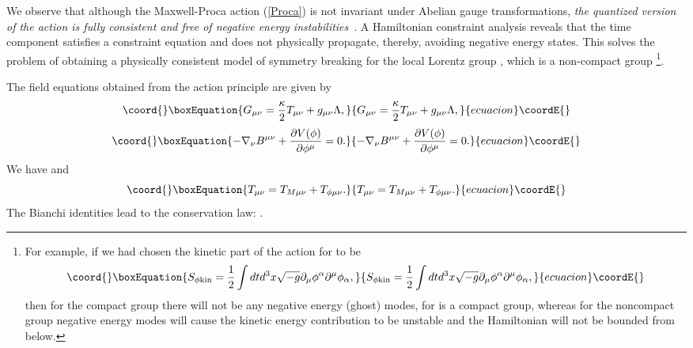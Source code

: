 \documentclass[a4paper,12pt]{article}
\begin{document}
We observe that although the Maxwell-Proca action (\ref{Proca})
is not invariant under Abelian \coordHE{} gauge transformations,
{\it the quantized version of the action is fully consistent and
free of negative energy instabilities}~\cite{Isenberg}. A Hamiltonian
constraint analysis reveals that
the time component \coordHE{} satisfies a constraint equation
and does not physically propagate, thereby, avoiding negative energy states. This
solves the problem of obtaining a physically consistent model of symmetry breaking
for the local Lorentz group \coordHE{}, which is a non-compact group \footnote{For
example, if we had chosen the kinetic part of the action for \myHighlight{$\phi^\mu$}\coordHE{} to be
\begin{equation}\coord{}\boxEquation{
S_{\phi{\rm kin}}=\frac{1}{2}\int
dtd^3x\sqrt{-g}\partial_\mu\phi^\alpha\partial^\mu\phi_\alpha,
}{
S_{\phi{\rm kin}}=\frac{1}{2}\int
dtd^3x\sqrt{-g}\partial_\mu\phi^\alpha\partial^\mu\phi_\alpha,
}{ecuacion}\coordE{}\end{equation}
then for the compact group \coordHE{} there will not be any negative
energy (ghost) modes, for \coordHE{} is a compact group, whereas
for the noncompact group \coordHE{} negative energy modes will cause the kinetic
energy contribution to be unstable and the Hamiltonian will not be bounded from
below.}.

The field equations obtained from the action principle are given
by
\begin{equation}\coord{}\boxEquation{
G_{\mu\nu}=\frac{\kappa}{2}T_{\mu\nu}+g_{\mu\nu}\Lambda,
}{
G_{\mu\nu}=\frac{\kappa}{2}T_{\mu\nu}+g_{\mu\nu}\Lambda,
}{ecuacion}\coordE{}\end{equation}
\begin{equation}\coord{}\boxEquation{
\label{Bequation}
-\nabla_\nu B^{\mu\nu}+\frac{\partial V(\phi)}{\partial\phi^\mu}=0.
}{
-\nabla_\nu B^{\mu\nu}+\frac{\partial V(\phi)}{\partial\phi^\mu}=0.
}{ecuacion}\coordE{}\end{equation}
We have \coordHE{}
and
\begin{equation}\coord{}\boxEquation{
T_{\mu\nu}=T_{M\mu\nu}+T_{\phi\mu\nu}.
}{
T_{\mu\nu}=T_{M\mu\nu}+T_{\phi\mu\nu}.
}{ecuacion}\coordE{}\end{equation}
The Bianchi identities \coordHE{} lead to the
conservation law: \coordHE{}.
\end{document}
